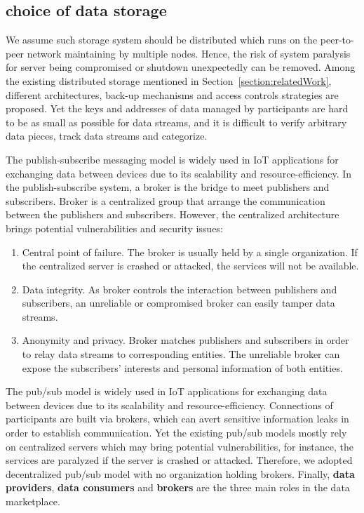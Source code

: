 \subsection{choice of data storage}
We assume such storage system should be distributed which runs on the peer-to-peer network maintaining by multiple nodes. Hence, the risk of system paralysis for server being compromised or shutdown unexpectedly can be removed. Among the existing distributed storage mentioned in Section~\ref{section:relatedWork}, different architectures, back-up mechanisms and access controls strategies are proposed. Yet the keys and addresses of data managed by participants are hard to be as small as possible for data streams, and it is difficult to verify arbitrary data pieces, track data streams and categorize.  





The publish-subscribe messaging model is widely used in IoT applications for exchanging data between devices due to its scalability and resource-efficiency. In the publish-subscribe system, a broker is the bridge to meet publishers and subscribers. Broker is a centralized group that arrange the communication between the publishers and subscribers. However, the centralized architecture brings potential vulnerabilities and security issues:

\begin{enumerate}
	\item Central point of failure. 
	The broker is usually held by a single organization. If the centralized server is crashed or attacked, the services will not be available. 	
	\item Data integrity.
	As broker controls the interaction between publishers and subscribers, an unreliable or compromised broker can easily tamper data streams. 
	\item Anonymity and privacy.
	Broker matches publishers and subscribers in order to relay data streams to corresponding entities. The unreliable broker can expose the subscribers' interests and personal information of both entities.  
\end{enumerate}

The pub/sub model is widely used in IoT applications for exchanging data between devices due to its scalability and resource-efficiency. Connections of participants are built via brokers, which can avert sensitive information leaks in order to establish communication. Yet the existing pub/sub models\cite{MQTT, Looci, centralPubSub} mostly rely on centralized servers which may bring potential vulnerabilities, for instance, the services are paralyzed if the server is crashed or attacked. Therefore, we adopted decentralized pub/sub model with no organization holding brokers. Finally, \textbf{data providers}, \textbf{data consumers} and \textbf{brokers} are the three main roles in the data marketplace.

